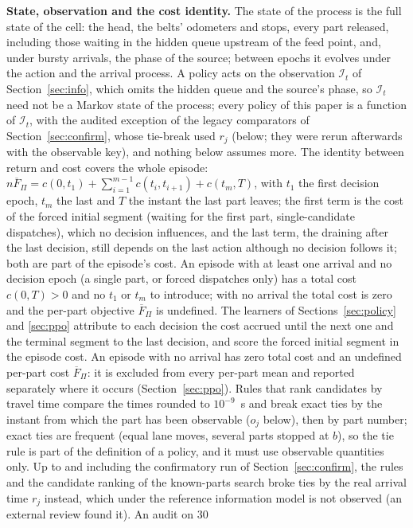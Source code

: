 \documentclass[11pt,a4paper]{article}
\theoremstyle{plain}
\theoremstyle{definition}
\theoremstyle{remark}
\newcommand{\Fpi}{\overline F_\Pi}
\newcommand{\I}{\mathcal I}
\begin{document}
\textbf{State, observation and the cost identity.} The state of the process is the full
state of the cell: the head, the belts' odometers and stops, every part released,
including those waiting in the hidden queue upstream of the feed point, and, under
bursty arrivals, the phase of the source; between epochs it evolves under the action and
the arrival process. A policy acts on the observation $\I_t$ of Section~\ref{sec:info},
which omits the hidden queue and the source's phase, so $\I_t$ need not be a Markov
state of the process; every policy of this paper is a function of $\I_t$, with the
audited exception of the legacy comparators of Section~\ref{sec:confirm}, whose
tie-break used $r_j$ (below; they were rerun afterwards with the observable key), and nothing below assumes more. The identity between return and cost covers the whole episode:
$n\Fpi=c(0,t_1)+\sum_{i=1}^{m-1}c(t_i,t_{i+1})+c(t_m,T)$, with $t_1$ the first decision
epoch, $t_m$ the last and $T$ the instant the last part leaves; the first term is the
cost of the forced initial segment (waiting for the first part, single-candidate
dispatches), which no decision influences, and the last term, the draining after the
last decision, still depends on the last action although no decision follows it; both
are part of the episode's cost. An episode with at least one arrival and no decision
epoch (a single part, or forced dispatches only) has a total cost $c(0,T)>0$ and no $t_1$
or $t_m$ to introduce; with no arrival the total cost is zero and the per-part objective
$\Fpi$ is undefined. The learners of Sections~\ref{sec:policy} and \ref{sec:ppo} attribute
to each decision the cost accrued until the next one and the terminal segment to the
last decision, and score the forced initial segment in the episode cost. An episode
with no arrival has zero total cost and an undefined per-part cost $\Fpi$: it is
excluded from every per-part mean and reported separately where it occurs
(Section~\ref{sec:ppo}). Rules that rank candidates by travel time compare the times rounded to
$10^{-9}$~s and break exact ties by the instant from which the part has been observable
($o_j$ below), then by part number; exact ties are frequent (equal lane moves, several
parts stopped at $b$), so the tie rule is part of the definition of a policy, and it
must use observable quantities only. Up to and including the confirmatory run of
Section~\ref{sec:confirm}, the rules and the candidate ranking of the known-parts search
broke ties by the real arrival time $r_j$ instead, which under the reference
information model is not observed (an external review found it). An audit on 30
\end{document}
